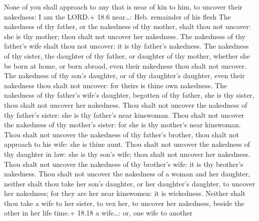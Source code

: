  None of you shall approach to any that is near of kin to
him, to uncover their nakedness: I am the LORD.+ 18.6 near\ldots: Heb.
remainder of his flesh  The nakedness of thy father, or the
nakedness of thy mother, shalt thou not uncover: she is thy mother; thou
shalt not uncover her nakedness.  The nakedness of thy
father's wife shalt thou not uncover: it is thy father's nakedness.
 The nakedness of thy sister, the daughter of thy father, or
daughter of thy mother, whether she be born at home, or born abroad,
even their nakedness thou shalt not uncover.  The nakedness
of thy son's daughter, or of thy daughter's daughter, even their
nakedness thou shalt not uncover: for theirs is thine own nakedness.
 The nakedness of thy father's wife's daughter, begotten of
thy father, she is thy sister, thou shalt not uncover her nakedness.
 Thou shalt not uncover the nakedness of thy father's
sister: she is thy father's near kinswoman.  Thou shalt not
uncover the nakedness of thy mother's sister: for she is thy mother's
near kinswoman.  Thou shalt not uncover the nakedness of
thy father's brother, thou shalt not approach to his wife: she is thine
aunt.  Thou shalt not uncover the nakedness of thy daughter
in law: she is thy son's wife; thou shalt not uncover her nakedness.
 Thou shalt not uncover the nakedness of thy brother's
wife: it is thy brother's nakedness.  Thou shalt not
uncover the nakedness of a woman and her daughter, neither shalt thou
take her son's daughter, or her daughter's daughter, to uncover her
nakedness; for they are her near kinswomen: it is wickedness.
 Neither shalt thou take a wife to her sister, to vex her,
to uncover her nakedness, beside the other in her life time.+ 18.18 a
wife\ldots: or, one wife to another

